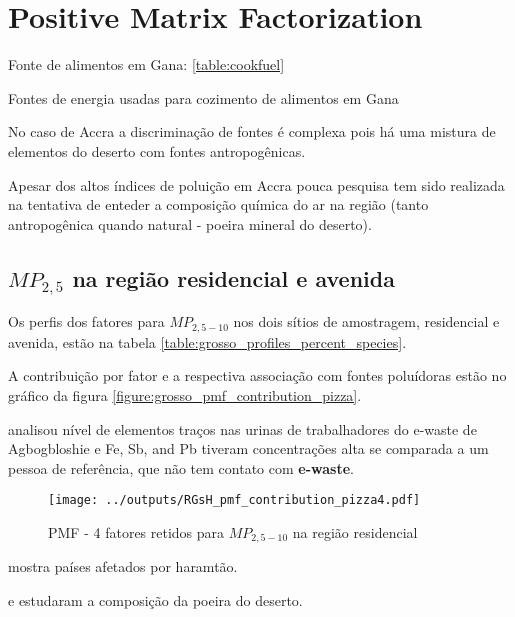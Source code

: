 \section{Positive Matrix Factorization}


Fonte de alimentos em Gana: \ref{table:cookfuel}
\begin{table}[H]
 \centering
  
  \caption{Fontes de energia usadas para cozimento de alimentos em 
           Gana \cite{ghanacensus2013} \label{table:cookfuel}}
\end{table}
No caso de Accra a discriminação de fontes é complexa pois
há uma mistura de elementos do deserto com fontes antropogênicas.

Apesar dos altos índices de poluição em Accra pouca pesquisa tem sido 
realizada na tentativa de enteder a composição química do ar na região
(tanto antropogênica quando natural - poeira mineral do deserto). 

\subsection{$MP_{2,5}$ na região residencial e avenida}

Os perfis dos fatores para $MP_{2,5-10}$ nos dois sítios de amostragem, 
residencial e avenida, estão na tabela \ref{table:grosso_profiles_percent_species}.

A contribuição por fator e a respectiva associação com fontes poluídoras
estão no gráfico da figura \ref{figure:grosso_pmf_contribution_pizza}. 

\cite{asante2012} analisou nível de elementos traços nas urinas de trabalhadores 
do e-waste de Agbogbloshie e Fe, Sb, and Pb tiveram concentrações alta se comparada
a um pessoa de referência, que não tem contato com \textbf{e-waste}.

\begin{figure}[H]
\begin{center}
  \texttt{[image: ../outputs/RGsH\_pmf\_contribution\_pizza4.pdf]}
  \caption{PMF - 4 fatores retidos para $MP_{2,5-10}$ na região residencial}
\end{center}
\end{figure}



\cite{kaku2016}


\cite{prospero2002} mostra países afetados por haramtão. 

\cite{engelbrecht2009a} e \cite{engelbrecht2009b} estudaram a composição 
da poeira do deserto.


